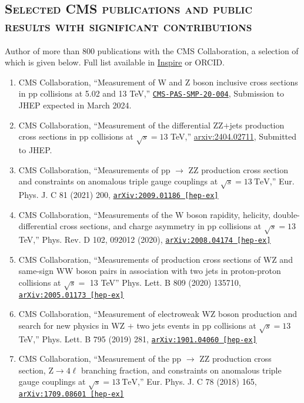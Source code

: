 \documentclass[10pt]{res} %
\begin{document}
\begin{resume}
\section{\textsc{Selected CMS publications and public results with significant contributions}}
Author of more than 800 publications with the CMS Collaboration, a selection of which is given below. Full list available in \href{https://inspirehep.net/authors/1280606}{Inspire} or ORCID. \\
\begin{enumerate}
  \item CMS Collaboration, ``Measurement of W and Z boson inclusive cross sections in pp collisions at 5.02 and 13 TeV,'' \href{https://cds.cern.ch/record/2868090}{\texttt{CMS-PAS-SMP-20-004}}, Submission to JHEP expected in March 2024.
  \item CMS Collaboration, ``Measurement of the differential ZZ$+$jets production cross sections in pp collisions at $\sqrt{s} = 13$ TeV,'' \href{https://arxiv.org/abs/2404.02711}{arxiv:2404.02711}, Submitted to JHEP.
  \item CMS Collaboration, ``Measurements of pp $\rightarrow$ ZZ production cross section and constraints on anomalous triple gauge couplings at $\sqrt{s} = 13~\mathrm{TeV}$,'' Eur. Phys. J. C 81 (2021) 200, \href{https://arxiv.org/abs/2009.01186}{\texttt{arXiv:2009.01186 [hep-ex]}}
  \item CMS Collaboration, ``Measurements of the W boson rapidity, helicity, double-differential cross sections, and charge asymmetry in pp collisions at $\sqrt{s}=13$\,TeV,'' Phys. Rev. D 102, 092012 (2020), \href{https://arxiv.org/abs/2008.04174}{\texttt{arXiv:2008.04174 [hep-ex]}}
  \item CMS Collaboration, ``Measurements of production cross sections of WZ and same-sign WW boson pairs in association with two jets in proton-proton collisions at $\sqrt{s} =$ 13 TeV'' Phys. Lett. B 809 (2020) 135710, \href{https://arxiv.org/abs/2005.01173}{\texttt{arXiv:2005.01173 [hep-ex]}}
  \item CMS Collaboration, ``Measurement of electroweak WZ boson production and search for new physics in WZ $+$ two jets events in pp collisions at $\sqrt{s}=13$\,TeV,'' Phys. Lett. B 795 (2019) 281, \href{https://arxiv.org/abs/1901.04060} {\texttt{arXiv:1901.04060 [hep-ex]}}
  \item CMS Collaboration, ``Measurement of the pp $\rightarrow$ ZZ production cross section, $\mathrm{Z} \to 4\ell$ branching fraction, and constraints on anomalous triple gauge couplings at $\sqrt{s} = 13~\mathrm{TeV}$,'' Eur. Phys. J. C 78 (2018) 165, \href{https://arxiv.org/abs/1709.08601}{\texttt{arXiv:1709.08601 [hep-ex]}}

\end{enumerate}
\end{resume}
\end{document}
